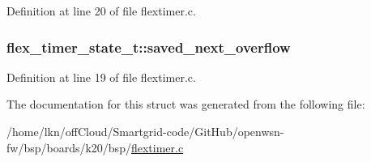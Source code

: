 Definition at line 20 of file flextimer.\+c.

\subsubsection[{\texorpdfstring{saved\+\_\+next\+\_\+overflow}{saved_next_overflow}}]{ flex\+\_\+timer\+\_\+state\+\_\+t\+::saved\+\_\+next\+\_\+overflow}\hypertarget{structflex__timer__state__t_a2a7a15a453a986ce9837c0525ad9f742}{}\label{structflex__timer__state__t_a2a7a15a453a986ce9837c0525ad9f742}


Definition at line 19 of file flextimer.\+c.



The documentation for this struct was generated from the following file\+:\begin{DoxyCompactItemize}
\item 
/home/lkn/off\+Cloud/\+Smartgrid-\/code/\+Git\+Hub/openwsn-\/fw/bsp/boards/k20/bsp/\hyperlink{flextimer_8c}{flextimer.\+c}\end{DoxyCompactItemize}
